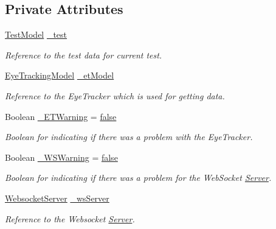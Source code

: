 \subsection*{Private Attributes}
\begin{DoxyCompactItemize}
\item 
\hyperlink{class_web_analyzer_1_1_models_1_1_data_model_1_1_test_model}{Test\+Model} \hyperlink{class_web_analyzer_1_1_controller_1_1_test_controller_a6084bcc401d37f7f8861fc0e9fb771b6}{\+\_\+test}
\begin{DoxyCompactList}\small\item\em Reference to the test data for current test. \end{DoxyCompactList}\item 
\hyperlink{class_web_analyzer_1_1_eye_tracking_1_1_eye_tracking_model}{Eye\+Tracking\+Model} \hyperlink{class_web_analyzer_1_1_controller_1_1_test_controller_a0db36e46096d444386af0d357905f430}{\+\_\+et\+Model}
\begin{DoxyCompactList}\small\item\em Reference to the Eye\+Tracker which is used for getting data. \end{DoxyCompactList}\item 
Boolean \hyperlink{class_web_analyzer_1_1_controller_1_1_test_controller_a33b43014ccf6b9f7cdd1e3136ac19d3a}{\+\_\+\+E\+T\+Warning} = \hyperlink{_u_i_2_h_t_m_l_resources_2js_2src_2export_8js_ae6c865df784842196d411c1466b01686}{false}
\begin{DoxyCompactList}\small\item\em Boolean for indicating if there was a problem with the Eye\+Tracker. \end{DoxyCompactList}\item 
Boolean \hyperlink{class_web_analyzer_1_1_controller_1_1_test_controller_a517bab0ee0c22871788bd498de86c27e}{\+\_\+\+W\+S\+Warning} = \hyperlink{_u_i_2_h_t_m_l_resources_2js_2src_2export_8js_ae6c865df784842196d411c1466b01686}{false}
\begin{DoxyCompactList}\small\item\em Boolean for indicating if there was a problem for the Web\+Socket \hyperlink{namespace_web_analyzer_1_1_server}{Server}. \end{DoxyCompactList}\item 
\hyperlink{class_web_analyzer_1_1_server_1_1_websocket_server}{Websocket\+Server} \hyperlink{class_web_analyzer_1_1_controller_1_1_test_controller_aeb605e9f2ad9c53af52fb846fe2a98a6}{\+\_\+ws\+Server}
\begin{DoxyCompactList}\small\item\em Reference to the Websocket \hyperlink{namespace_web_analyzer_1_1_server}{Server}. \end{DoxyCompactList}\item 

\end{DoxyCompactItemize}
